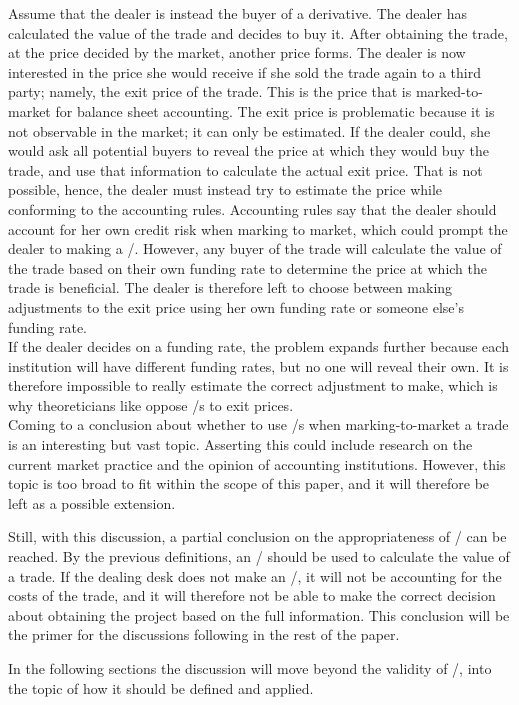\documentclass[main.tex]{subfiles}
\begin{document}
    Assume that the dealer is instead the buyer of a derivative.
    The dealer has calculated the value of the trade and decides to buy it.
    After obtaining the trade, at the price decided by the market, another price forms. 
    The dealer is now interested in the price she would receive 
    if she sold the trade again to a third party; namely, the exit price of the trade.
    This is the price that is marked-to-market for balance sheet accounting.
    The exit price is problematic because it is not observable in the market; 
    it can only be estimated.
    If the dealer could, she would ask all potential buyers to reveal the price 
    at which they would buy the trade, and use that information to calculate the actual exit price.
    That is not possible, hence, the dealer must instead try to estimate the price
    while conforming to the accounting rules.
    Accounting rules say that the dealer should account for her own credit risk 
    when marking to market, which could prompt the dealer to making a \DVA/.
    However, any buyer of the trade will calculate the value of the trade
    based on their own funding rate to determine the price at which the trade is beneficial.
    The dealer is therefore left to choose between making adjustments to the exit price
    using her own funding rate or someone else's funding rate.
    \\
    If the dealer decides on a funding rate, the problem expands further
    because each institution will have different funding rates, but no one will reveal their own.
    It is therefore impossible to really estimate the correct adjustment to make,
    which is why theoreticians like \textcite{HullWhite2012FVA} oppose \FVA/s to exit prices.
    \\
    Coming to a conclusion about whether to use \FVA/s when marking-to-market a trade
    is an interesting but vast topic.
    Asserting this could include research on the current market practice and
    the opinion of accounting institutions.
    However, this topic is too broad to fit within the scope of this paper,
    and it will therefore be left as a possible extension.

    Still, with this discussion, 
    a partial conclusion on the appropriateness of \FVA/ can be reached.
    By the previous definitions, an \FVA/ should be used to calculate the value of a trade.
    If the dealing desk does not make an \FVA/, it will not be accounting for the costs of the trade,
    and it will therefore not be able to make the correct decision about obtaining the project based on the full information.
    This conclusion will be the primer for the discussions following in the rest of the paper.
    
    In the following sections the discussion will move beyond the validity of \FVA/,
    into the topic of how it should be defined and applied.
    
\end{document}

